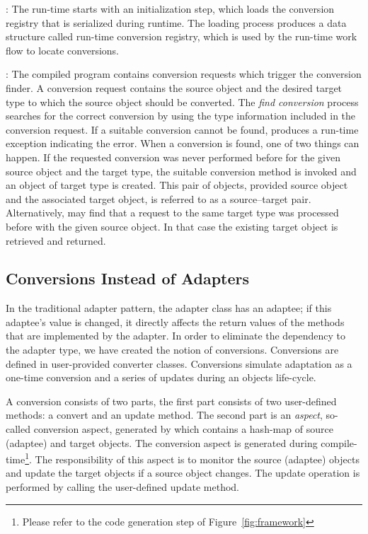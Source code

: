 \begin{description}
\item{}: The \zamk run-time starts with an initialization step, which loads the conversion registry that is serialized during runtime. 
The loading process produces a data structure called run-time conversion registry, which is used by the run-time work flow to locate conversions.
\item{}: The compiled program contains \zamk conversion requests which trigger the conversion finder. 
A conversion request contains the source object and the desired target type to which the source object should be converted. 
The \emph{find conversion} process searches for the correct conversion by using the type information included in the conversion request. 
If a suitable conversion cannot be found, \zamk produces a run-time exception indicating the error. 
When a conversion is found, one of two things can happen. 
If the requested conversion was never performed before for the given source object and the target type, the suitable conversion method is invoked and an object of target type is created. 
This pair of objects, provided source object and the associated target object, is referred to as a source--target pair. 
Alternatively, \zamk may find that a request to the same target type was processed before with the given source object. 
In that case the existing target object is retrieved and returned. 
\end{description}


\subsection{Conversions Instead of Adapters}
In the traditional adapter pattern, the adapter class has an adaptee; if this adaptee's value is changed, it directly affects the return values of the methods that are implemented by the adapter.
In order to eliminate the dependency to the adapter type, we have created the notion of conversions. 
Conversions are defined in user-provided converter classes. Conversions simulate adaptation as a one-time conversion and a series of updates during an objects life-cycle. 

A conversion consists of two parts, the first part consists of two user-defined methods: a convert and an update method. 
The second part is an \emph{aspect}, so-called conversion aspect, generated by \zamk which contains a hash-map of source (adaptee) and target objects. 
The conversion aspect is generated during compile-time\footnote{Please refer to the code generation step of Figure~\ref{fig:framework}}. 
The responsibility of this aspect is to monitor the source (adaptee) objects and update the target objects if a source object changes. 
The update operation is performed by calling the user-defined update method.

